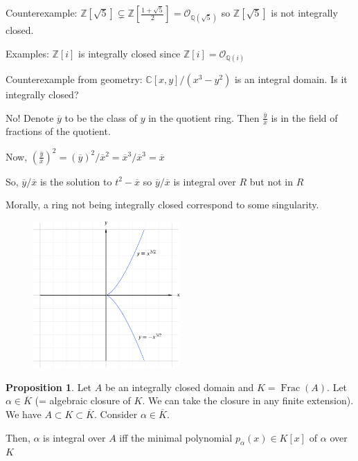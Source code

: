 \documentclass[openany]{amsbook}
\numberwithin{section}{chapter}
\theoremstyle{definition}
\newtheorem{proposition}[theorem]{Proposition}
\newcommand{\Frac}{\operatorname{Frac}}
\begin{document}
Counterexample: \(\mathbb{Z} [\sqrt{5}] \subsetneq \mathbb{Z} \left[ \frac{1+\sqrt{5}}{2} \right] = \mathcal{O}_{\mathbb{Q}(\sqrt{5})}\) so \(\mathbb{Z} [\sqrt{5}]\) is not integrally closed.

Examples: \(\mathbb{Z} [i]\) is integrally closed since \(\mathbb{Z} [i] = \mathcal{O} _{\mathbb{Q} (i)}\) 

Counterexample from geometry: \(\mathbb{C} [x,y] / (x^3 - y^2)\) is an integral domain. Is it integrally closed?

No! Denote \(\overline{y}\) to be the class of \(y\) in the quotient ring. Then \(\frac{\overline{y}}{\overline{x}}\) is in the field of fractions of the quotient.

Now, \(\left( \frac{\overline{y}}{\overline{x}} \right) ^2 = (\overline{y})^2 / \overline{x} ^2 = \overline{x} ^3 / \overline{x} ^3 = \overline{x}\) 

So, \(\overline{y} / \overline{x}\) is the solution to \(t^2 - \overline{x}\) so \(\overline{y} / \overline{x}\) is integral over \(R\) but not in \(R\)

Morally, a ring not being integrally closed correspond to some singularity.

\begin{figure}[H]
    \centering
    \includegraphics[width=0.5\textwidth]{img/y2x3}
\end{figure}

\begin{proposition}
    Let \(A\) be an integrally closed domain and \(K = \Frac(A)\). Let \(\alpha \in \overline{K}\) (= algebraic closure of \(K\). We can take the closure in any finite extension). We have \(A \subset K \subset \overline{K}\). Consider \(\alpha \in \overline{K}\).

    Then, \(\alpha\) is integral over \(A\) iff the minimal polynomial \(p_\alpha (x) \in K[x]\) of \(\alpha\) over \(K\) 
\end{proposition}
\end{document}
